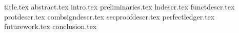\documentclass[conference,compsoc]{IEEEtran}
\begin{document}
\pagestyle{plain}
{title.tex}
{abstract.tex}
{intro.tex}
{preliminaries.tex}
{lndescr.tex}
{functdescr.tex}
{protdescr.tex}
{combsigndescr.tex}
{secproofdescr.tex}
{perfectledger.tex}
{futurework.tex}
{conclusion.tex}



\end{document}
